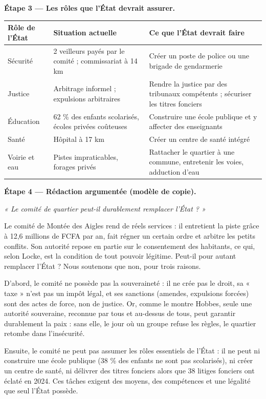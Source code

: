 \documentclass[11pt]{article}
\begin{document}
\begin{exoresolu}
\textbf{Étape 3 — Les rôles que l'État devrait assurer.}

\begin{center}
\begin{tabularx}{\linewidth}{|l|X|X|}\hline
\rowcolor{popblueL} \textbf{Rôle de l'État} & \textbf{Situation actuelle} & \textbf{Ce que l'État devrait faire} \\ \hline
Sécurité & 2 veilleurs payés par le comité ; commissariat à 14 km & Créer un poste de police ou une brigade de gendarmerie \\ \hline
Justice & Arbitrage informel ; expulsions arbitraires & Rendre la justice par des tribunaux compétents ; sécuriser les titres fonciers \\ \hline
Éducation & 62 \% des enfants scolarisés, écoles privées coûteuses & Construire une école publique et y affecter des enseignants \\ \hline
Santé & Hôpital à 17 km & Créer un centre de santé intégré \\ \hline
Voirie et eau & Pistes impraticables, forages privés & Rattacher le quartier à une commune, entretenir les voies, adduction d'eau \\ \hline
\end{tabularx}
\end{center}

\textbf{Étape 4 — Rédaction argumentée (modèle de copie).}

\emph{« Le comité de quartier peut-il durablement remplacer l'État ? »}

Le comité de Montée des Aigles rend de réels services : il entretient la piste grâce à 12,6 millions de FCFA par an, fait régner un certain ordre et arbitre les petits conflits. Son autorité repose en partie sur le consentement des habitants, ce qui, selon Locke, est la condition de tout pouvoir légitime. Peut-il pour autant remplacer l'État ? Nous soutenons que non, pour trois raisons.

D'abord, le comité ne possède pas la souveraineté : il ne crée pas le droit, sa « taxe » n'est pas un impôt légal, et ses sanctions (amendes, expulsions forcées) sont des actes de force, non de justice. Or, comme le montre Hobbes, seule une autorité souveraine, reconnue par tous et au-dessus de tous, peut garantir durablement la paix : sans elle, le jour où un groupe refuse les règles, le quartier retombe dans l'insécurité.

Ensuite, le comité ne peut pas assumer les rôles essentiels de l'État : il ne peut ni construire une école publique (38 \% des enfants ne sont pas scolarisés), ni créer un centre de santé, ni délivrer des titres fonciers alors que 38 litiges fonciers ont éclaté en 2024. Ces tâches exigent des moyens, des compétences et une légalité que seul l'État possède.


\end{exoresolu}
\end{document}
